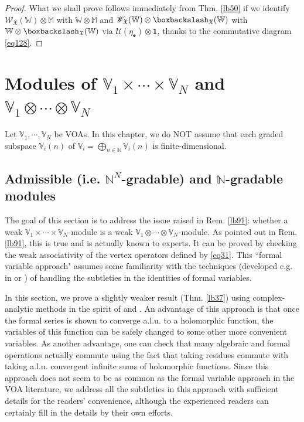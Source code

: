 \documentclass[11pt,b5paper,notitlepage]{article}
\theoremstyle{definition}
\theoremstyle{plain}
\newcommand{\mc}{\mathcal}
\newcommand{\idt}{\mathbf{1}}
\newcommand{\scr}{\mathscr}
\newcommand{\blt}{\bullet}
\newcommand{\Vbb}{\mathbb V}
\newcommand{\Wbb}{\mathbb W}
\newcommand{\Mbb}{\mathbb M}
\newcommand{\Nbb}{\mathbb N}
\newcommand{\<}{\left\langle}
\renewcommand{\>}{\right\rangle}
\newcommand{\fx}{\mathfrak{X}}
\newcommand{\bbs}{\boxbackslash}
\numberwithin{equation}{section}
\begin{document}
\begin{proof}
What we shall prove follows immediately from Thm. \ref{lb50} if we identify $\scr W_\fx(\Wbb)\otimes\Mbb$ with $\Wbb\otimes\Mbb$ and $\scr W_\fx(\Wbb)\otimes\bbs_\fx(\Wbb)$ with $\Wbb\otimes\bbs_\fx(\Wbb)$ via $\mc U(\eta_\blt)\otimes\idt$, thanks to the commutative diagram \eqref{eq128}.
\end{proof}














\appendix

\section{Modules of $\Vbb_1\times \cdots \times \Vbb_N$ and $\Vbb_1\otimes \cdots \otimes \Vbb_N$} \label{lb90}

Let $\Vbb_1,\cdots,\Vbb_N$ be VOAs. In this chapter, we do NOT assume that each graded subspace $\Vbb_i(n)$ of $\Vbb_i=\bigoplus_{n\in\Nbb}\Vbb_i(n)$ is finite-dimensional.


\subsection{Admissible (i.e. $\Nbb^N$-gradable) and $\Nbb$-gradable modules}\label{lb34}


The goal of this section is to address the issue raised in Rem. \ref{lb91}: whether a weak $\Vbb_1\times\cdots\times\Vbb_N$-module is a weak $\Vbb_1\otimes\cdots\otimes\Vbb_N$-module. As pointed out in Rem. \ref{lb91}, this is true and is actually known to experts. It can be proved by checking the weak associativity of the vertex operators defined by \eqref{eq31}. This ``formal variable approach" assumes some familiarity with the techniques (developed e.g. in \cite{Kac-beginners} or \cite{LL-introduction}) of handling the subtleties in the identities of formal variables. 

In this section, we prove a slightly weaker result (Thm. \ref{lb37}) using complex-analytic methods in the spirit of \cite{FHL93} and \cite{GuiLec}. An advantage of this approach is that once the formal series is shown to converge a.l.u. to a holomorphic function, the variables of this function can be safely changed to some other more convenient variables. As another advantage, one can check that many algebraic and formal operations actually commute using the fact that taking residues commute with taking a.l.u. convergent infinite sums of holomorphic functions. Since this approach does not seem to be as common as the formal variable approach in the VOA literature, we address all the subtleties in this approach with sufficient details for the readers' convenience, although the experienced readers can certainly fill in the details by their own efforts.
\end{document}
